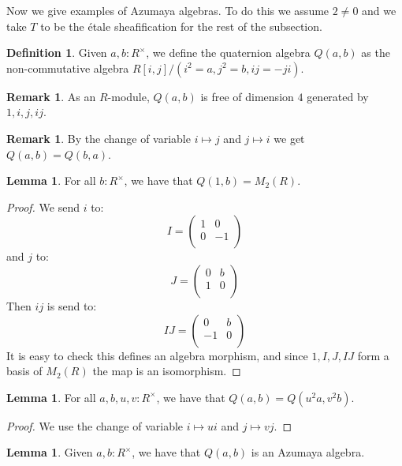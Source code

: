 \documentclass[10pt,a4paper]{article}
\theoremstyle{definition}
\newtheorem{lemma}[theorem]{Lemma}
\newtheorem{definition}[theorem]{Definition}
\newtheorem{remark}[theorem]{Remark}
\begin{document}
Now we give examples of Azumaya algebras. To do this we assume $2\not=0$ and we take $T$ to be the étale sheafification for the rest of the subsection.

\begin{definition}
Given $a,b:R^\times$, we define the quaternion algebra $Q(a,b)$ as the non-commutative algebra $R[i,j]/(i^2=a,j^2=b,ij=-ji)$.
\end{definition}

\begin{remark}
As an $R$-module, $Q(a,b)$ is free of dimension $4$ generated by $1,i,j,ij$.
\end{remark}

\begin{remark}
By the change of variable $i\mapsto j$ and $j\mapsto i$ we get $Q(a,b) = Q(b,a)$.
\end{remark}

\begin{lemma}\label{quaternion-split}
For all $b:R^\times$, we have that $Q(1,b) = M_2(R)$.
\end{lemma}

\begin{proof}
We send $i$ to:
\[I = \begin{pmatrix}
1 & 0\\
0 & -1\\
\end{pmatrix}\]
and $j$ to:
\[J = \begin{pmatrix}
0 & b\\
1 & 0\\
\end{pmatrix}\]
Then $ij$ is send to:
\[IJ = \begin{pmatrix}
0 & b\\
-1 & 0\\
\end{pmatrix}\]
It is easy to check this defines an algebra morphism, and since $1,I,J,IJ$ form a basis of $M_2(R)$ the map is an isomorphism.
\end{proof}

\begin{lemma}\label{quaternion-change-variable}
For all $a,b,u,v:R^\times$, we have that $Q(a,b) = Q(u^2a,v^2b)$.
\end{lemma}

\begin{proof}
We use the change of variable $i\mapsto ui$ and $j\mapsto vj$.
\end{proof}

\begin{lemma}
Given $a,b:R^\times$, we have that $Q(a,b)$ is an Azumaya algebra. 
\end{lemma}
\end{document}
